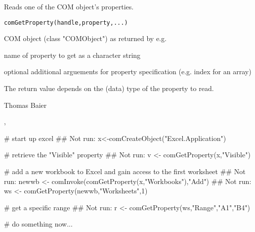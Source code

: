 \begin{Description}\relax
Reads one of the COM object's properties.
\end{Description}
\begin{Usage}
\begin{verbatim}
comGetProperty(handle,property,...)
\end{verbatim}
\end{Usage}
\begin{Arguments}
\begin{ldescription}
\item[\code{handle}] COM object (class "COMObject") as returned by e.g.
\item[\code{property}] name of property to get as a character string
\item[\code{...}] optional additional arguements for property specification (e.g.
index for an array)
\end{ldescription}
\end{Arguments}
\begin{Value}
The return value depends on the (data) type of the property to read.
\end{Value}
\begin{Author}\relax
Thomas Baier
\end{Author}
\begin{SeeAlso}\relax
{}, 
\end{SeeAlso}
\begin{Examples}
\begin{ExampleCode}
# start up excel
## Not run: x<-comCreateObject("Excel.Application")

# retrieve the "Visible" property
## Not run: v <- comGetProperty(x,"Visible")

# add a new workbook to Excel and gain access to the first worksheet
## Not run: newwb <- comInvoke(comGetProperty(x,"Workbooks"),"Add")
## Not run: ws <- comGetProperty(newwb,"Worksheets",1)

# get a specific range
## Not run: r <- comGetProperty(ws,"Range","A1","B4")

# do something now...
\end{ExampleCode}
\end{Examples}

